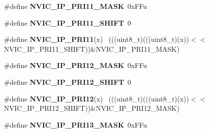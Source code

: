 \begin{DoxyCompactItemize}
\item 
\hypertarget{group___n_v_i_c___register___masks_ga7b5a3e3066c5182f03daa31b9eb9b86e}{}\#define {\bfseries N\+V\+I\+C\+\_\+\+I\+P\+\_\+\+P\+R\+I11\+\_\+\+M\+A\+S\+K}~0x\+F\+Fu\label{group___n_v_i_c___register___masks_ga7b5a3e3066c5182f03daa31b9eb9b86e}

\item 
\hypertarget{group___n_v_i_c___register___masks_ga8993ee67036a42b068f379cf79e00055}{}\#define {\bfseries N\+V\+I\+C\+\_\+\+I\+P\+\_\+\+P\+R\+I11\+\_\+\+S\+H\+I\+F\+T}~0\label{group___n_v_i_c___register___masks_ga8993ee67036a42b068f379cf79e00055}

\item 
\hypertarget{group___n_v_i_c___register___masks_ga17552ec6f1dbbb89decaaf615c301e68}{}\#define {\bfseries N\+V\+I\+C\+\_\+\+I\+P\+\_\+\+P\+R\+I11}(x)                                              ~(((uint8\+\_\+t)(((uint8\+\_\+t)(x))$<$$<$N\+V\+I\+C\+\_\+\+I\+P\+\_\+\+P\+R\+I11\+\_\+\+S\+H\+I\+F\+T))\&N\+V\+I\+C\+\_\+\+I\+P\+\_\+\+P\+R\+I11\+\_\+\+M\+A\+S\+K)\label{group___n_v_i_c___register___masks_ga17552ec6f1dbbb89decaaf615c301e68}

\item 
\hypertarget{group___n_v_i_c___register___masks_gad0fb4b171a031d28f108178295f49e1e}{}\#define {\bfseries N\+V\+I\+C\+\_\+\+I\+P\+\_\+\+P\+R\+I12\+\_\+\+M\+A\+S\+K}~0x\+F\+Fu\label{group___n_v_i_c___register___masks_gad0fb4b171a031d28f108178295f49e1e}

\item 
\hypertarget{group___n_v_i_c___register___masks_gabe6373dee977905c5aec4e9eadd03ef9}{}\#define {\bfseries N\+V\+I\+C\+\_\+\+I\+P\+\_\+\+P\+R\+I12\+\_\+\+S\+H\+I\+F\+T}~0\label{group___n_v_i_c___register___masks_gabe6373dee977905c5aec4e9eadd03ef9}

\item 
\hypertarget{group___n_v_i_c___register___masks_gac26671c8099e2cd4d99b4c6ce6244076}{}\#define {\bfseries N\+V\+I\+C\+\_\+\+I\+P\+\_\+\+P\+R\+I12}(x)                                              ~(((uint8\+\_\+t)(((uint8\+\_\+t)(x))$<$$<$N\+V\+I\+C\+\_\+\+I\+P\+\_\+\+P\+R\+I12\+\_\+\+S\+H\+I\+F\+T))\&N\+V\+I\+C\+\_\+\+I\+P\+\_\+\+P\+R\+I12\+\_\+\+M\+A\+S\+K)\label{group___n_v_i_c___register___masks_gac26671c8099e2cd4d99b4c6ce6244076}

\item 
\hypertarget{group___n_v_i_c___register___masks_ga8b0064b513f2b656b6e2fdaa9d7f8ef0}{}\#define {\bfseries N\+V\+I\+C\+\_\+\+I\+P\+\_\+\+P\+R\+I13\+\_\+\+M\+A\+S\+K}~0x\+F\+Fu\label{group___n_v_i_c___register___masks_ga8b0064b513f2b656b6e2fdaa9d7f8ef0}


\end{DoxyCompactItemize}
